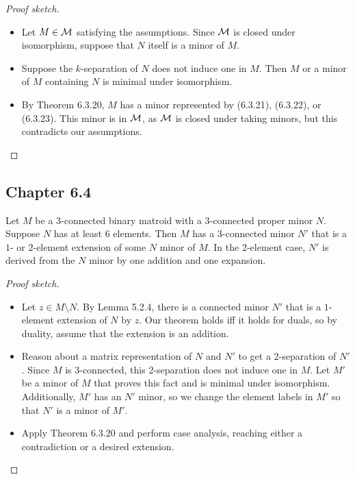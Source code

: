 \begin{proof}[Proof sketch]
  \begin{itemize}
    \item Let $M \in \mathcal{M}$ satisfying the assumptions. Since $\mathcal{M}$ is closed under isomorphism, suppose that $N$ itself is a minor of $M$.
    \item Suppose the $k$-separation of $N$ does not induce one in $M$. Then $M$ or a minor of $M$ containing $N$ is minimal under isomorphism.
    \item By Theorem 6.3.20, $M$ has a minor represented by (6.3.21), (6.3.22), or (6.3.23). This minor is in $\mathcal{M}$, as $\mathcal{M}$ is closed under taking minors, but this contradicts our assumptions.
  \end{itemize}
\end{proof}


\subsection{Chapter 6.4}

\begin{theorem}[6.4.1]
  \label{thm:6.4.1}
  Let $M$ be a $3$-connected binary matroid with a $3$-connected proper minor $N$. Suppose $N$ has at least $6$ elements. Then $M$ has a $3$-connected minor $N'$ that is a $1$- or $2$-element extension of some $N$ minor of $M$. In the $2$-element case, $N'$ is derived from the $N$ minor by one addition and one expansion.
\end{theorem}

\begin{proof}[Proof sketch]
  \begin{itemize}
    \item Let $z \in M \setminus N$. By Lemma 5.2.4, there is a connected minor $N'$ that is a $1$-element extension of $N$ by $z$. Our theorem holds iff it holds for duals, so by duality, assume that the extension is an addition.
    \item Reason about a matrix representation of $N$ and $N'$ to get a $2$-separation of $N'$. Since $M$ is $3$-connected, this $2$-separation does not induce one in $M$. Let $M'$ be a minor of $M$ that proves this fact and is minimal under isomorphism. Additionally, $M'$ has an $N'$ minor, so we change the element labels in $M'$ so that $N'$ is a minor of $M'$.
    \item Apply Theorem 6.3.20 and perform case analysis, reaching either a contradiction or a desired extension.
  \end{itemize}
\end{proof}
